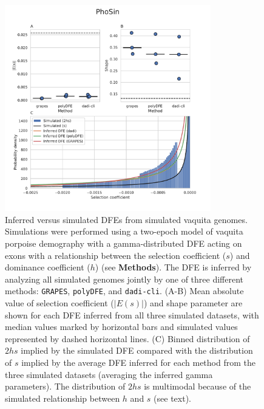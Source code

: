 \documentclass[hidelinks]{article}
\newcommand{\polydfe}{\texttt{polyDFE}\xspace}
\newcommand{\dadicli}{\texttt{dadi-cli}\xspace}
\newcommand{\grapes}{\texttt{GRAPES}\xspace}
\begin{document}
    \begin{figure}[b!]
        \centering
        \includegraphics[width=0.8\textwidth]{figures/PhoSin/Vaquita2Epoch_1R22/PhoSin_Vaquita2Epoch_1R22_Gamma_R22_Phocoena_sinus.mPhoSin1.pri.110_exons_DFE_plot.pdf}
        \caption{
        \label{fig:vaquita-dfe}
        Inferred versus simulated DFEs from simulated vaquita genomes.
        Simulations were performed using a two-epoch model of vaquita porpoise demography with a gamma-distributed DFE
        acting on exons with a relationship between the selection coefficient ($s$) and dominance coefficient ($h$) (see \textbf{Methods}).
        The DFE is inferred by analyzing all simulated genomes jointly by one of three different methods:
        \grapes, \polydfe, and \dadicli.
        (A-B) Mean absolute value of selection coefficient ($\lvert E(s) \rvert $) and shape parameter are
        shown for each DFE inferred from all three simulated datasets,
        with median values marked by horizontal bars
        and simulated values represented by dashed horizontal lines. 
        (C) Binned distribution of $2hs$ implied by the simulated DFE compared with
        the distribution of $s$ implied by the average DFE inferred for each method from the three simulated datasets (averaging the inferred gamma parameters).
        The distribution of $2 h s$ is multimodal because of the simulated relationship between $h$ and $s$ (see text).
        }
    \end{figure}
\end{document}
